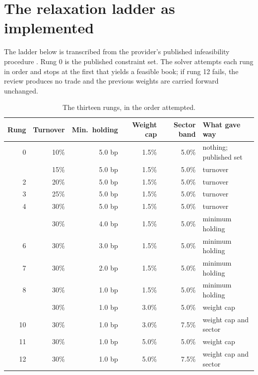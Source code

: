 \section{The relaxation ladder as implemented}
\label{app:ladder}
The ladder below is transcribed from the provider's published infeasibility
procedure \citep{msci2012minvol}. Rung 0 is the published constraint set. The
solver attempts each rung in order and stops at the first that yields a
feasible book; if rung 12 fails, the review produces no trade and the previous
weights are carried forward unchanged.

\begin{table}[tbp]
\caption{The thirteen rungs, in the order attempted.}
\label{tab:ladder}
\centering\small
\setlength{\tabcolsep}{6pt}
\begin{tabular}{rrrrrl}
\toprule
Rung & Turnover & Min.\ holding & Weight cap & Sector band & What gave way\\
\midrule
 0 & 10\% & 5.0 bp & 1.5\% & 5.0\% & nothing; published set\\
\addlinespace
 1 & 15\% & 5.0 bp & 1.5\% & 5.0\% & turnover\\
 2 & 20\% & 5.0 bp & 1.5\% & 5.0\% & turnover\\
 3 & 25\% & 5.0 bp & 1.5\% & 5.0\% & turnover\\
 4 & 30\% & 5.0 bp & 1.5\% & 5.0\% & turnover\\
\addlinespace
 5 & 30\% & 4.0 bp & 1.5\% & 5.0\% & minimum holding\\
 6 & 30\% & 3.0 bp & 1.5\% & 5.0\% & minimum holding\\
 7 & 30\% & 2.0 bp & 1.5\% & 5.0\% & minimum holding\\
 8 & 30\% & 1.0 bp & 1.5\% & 5.0\% & minimum holding\\
\addlinespace
 9 & 30\% & 1.0 bp & 3.0\% & 5.0\% & weight cap\\
10 & 30\% & 1.0 bp & 3.0\% & 7.5\% & weight cap and sector\\
11 & 30\% & 1.0 bp & 5.0\% & 5.0\% & weight cap\\
12 & 30\% & 1.0 bp & 5.0\% & 7.5\% & weight cap and sector\\
\bottomrule
\end{tabular}
\end{table}
